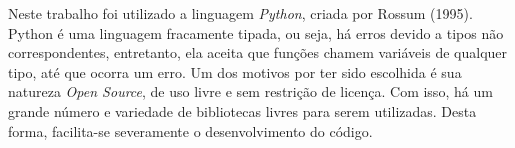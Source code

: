 Neste trabalho foi utilizado a linguagem \textit{Python}, criada por Rossum (1995)\cite{python}.
Python é uma linguagem fracamente tipada, ou seja, há erros devido a tipos não correspondentes, entretanto, ela aceita que funções chamem variáveis de qualquer tipo, até que ocorra um erro.
Um dos motivos por ter sido escolhida é sua natureza \textit{Open Source}, de uso livre e sem restrição de licença.
Com isso, há um grande número e variedade de bibliotecas livres para serem utilizadas.
Desta forma, facilita-se severamente o desenvolvimento do código.
